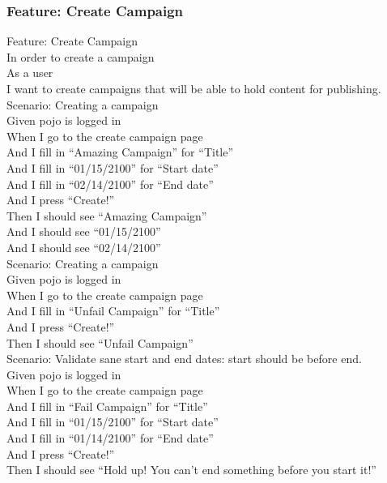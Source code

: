 \documentclass[12pt]{article}
\begin{document}
\subsubsection{Feature: Create Campaign}

Feature: Create Campaign \\
  In order to create a campaign \\
  As a user \\
  I want to create campaigns that will be able to hold content for publishing. \\
  
Scenario: Creating a campaign \\
  Given pojo is logged in \\
  When I go to the create campaign page \\
  And I fill in ``Amazing Campaign'' for ``Title'' \\
  And I fill in ``01/15/2100'' for ``Start date'' \\
  And I fill in ``02/14/2100'' for ``End date''   \\
  And I press ``Create!'' \\
  Then I should see ``Amazing Campaign'' \\
  And I should see ``01/15/2100'' \\
  And I should see ``02/14/2100'' \\

Scenario: Creating a campaign \\
  Given pojo is logged in \\
  When I go to the create campaign page \\
  And I fill in ``Unfail Campaign'' for ``Title'' \\
  And I press ``Create!'' \\
  Then I should see ``Unfail Campaign'' \\

Scenario: Validate sane start and end dates: start should be before end. \\
  Given pojo is logged in \\
  When I go to the create campaign page \\
  And I fill in ``Fail Campaign'' for ``Title'' \\
  And I fill in ``01/15/2100'' for ``Start date'' \\
  And I fill in ``01/14/2100'' for ``End date'' \\
  And I press ``Create!'' \\
  Then I should see ``Hold up! You can't end something before you start it!'' \\
\end{document}
